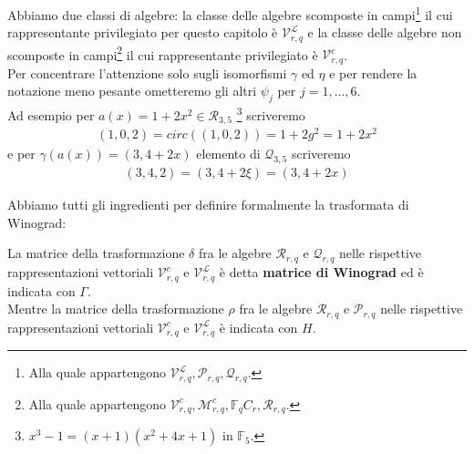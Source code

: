 Abbiamo due classi di algebre: la classe delle algebre scomposte in campi\footnote{Alla quale appartengono $\mathcal{V}_{r,q}^{\mathscr{L}} , \mathcal{P}_{r,q} , \mathcal{Q}_{r,q}$.} il cui rappresentante privilegiato per questo capitolo è $\mathcal{V}_{r,q}^{\mathscr{L}} $ e la classe delle algebre non scomposte in campi\footnote{Alla quale appartengono $\mathcal{V}_{r,q}^{c}  , \mathcal{M}_{r,q }^{c}, \mathbb{F}_{q}C_{r}, \mathcal{R}_{r,q} $.} il cui rappresentante privilegiato è  $\mathcal{V}_{r,q}^{c} $.
\\
Per concentrare l'attenzione solo sugli isomorfismi $\gamma$ ed $\eta$ e per rendere la notazione meno pesante ometteremo gli altri $\psi_{j}$ per $j =1, \dots, 6 $.\\
Ad esempio per $a(x) =  1 + 2x^2 \in \mathcal{R}_{3,5} $ \footnote{$x^3-1 = (x+1)(x^2+4x+1)$ in $\mathbb{F}_{5}$.} scriveremo
\begin{align*}
   (1,0,2) = circ((1,0,2)) = 1+2g^2 = 1 + 2x^2
\end{align*}
e per $\gamma(a(x)) = (3, 4 + 2x )$ elemento di $\mathcal{Q}_{3,5}$ scriveremo
\begin{align*}
   (3,4,2)  = (3 , 4 + 2\xi) = (3 , 4 + 2x )
\end{align*}

Abbiamo tutti gli ingredienti per definire formalmente la trasformata di Winograd:
\begin{definizione}
   La matrice della trasformazione $\delta$ fra le algebre $\mathcal{R}_{r,q} $ e $ \mathcal{Q}_{r,q} $ nelle rispettive rappresentazioni vettoriali $ \mathcal{V}_{r, q}^{c} $ e $\mathcal{V}_{r,q}^{\mathscr{L}} $ è detta {\bf matrice di Winograd} ed è indicata con $\Gamma$.\\
   Mentre la matrice della trasformazione $\rho$ fra le algebre $\mathcal{R}_{r,q} $ e $ \mathcal{P}_{r,q} $ nelle rispettive rappresentazioni vettoriali $ \mathcal{V}_{r, q}^{c} $ e $\mathcal{V}_{r,q}^{\mathscr{L}} $ è indicata con $H$.
\end{definizione}


